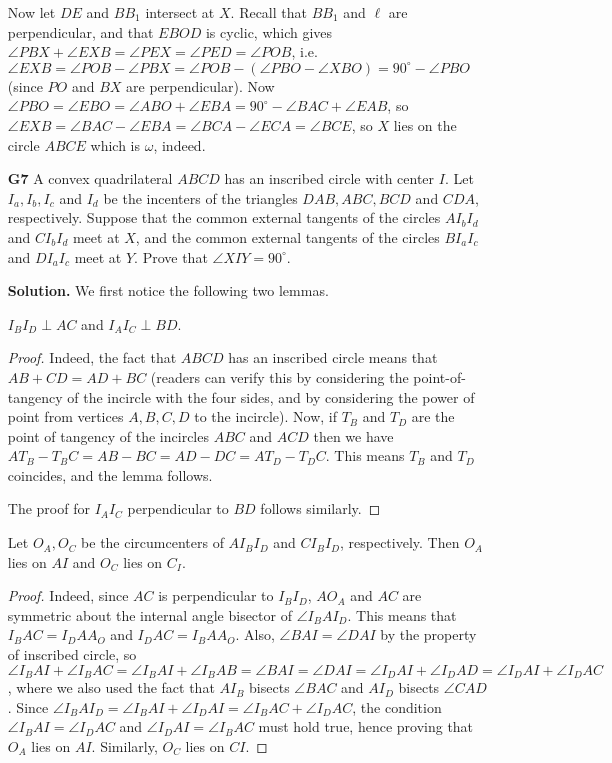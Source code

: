 \documentclass[11pt,a4paper]{article}
\begin{document}
\begin{enumerate}
    Now let $DE$ and $BB_1$ intersect at $X$. Recall that $BB_1$ and $\ell$ are perpendicular, and that $EBOD$ is cyclic, which gives $\angle PBX+\angle EXB=\angle PEX=\angle PED=\angle POB$, i.e. $\angle EXB=\angle POB-\angle PBX=\angle POB-(\angle PBO-\angle XBO)=90^{\circ}-\angle PBO$ (since $PO$ and $BX$ are perpendicular). Now $\angle PBO=\angle EBO=\angle ABO+\angle EBA=90^{\circ}-\angle BAC+\angle EAB$, so $\angle EXB=\angle BAC-\angle EBA=\angle BCA-\angle ECA=\angle BCE$, so $X$ lies on the circle $ABCE$ which is $\omega$, indeed. 
	
	\item[\textbf{G7}] A convex quadrilateral $ABCD$ has an inscribed circle with center $I$. Let $I_a, I_b, I_c$ and $I_d$ be the incenters of the triangles $DAB, ABC, BCD$ and $CDA$, respectively. Suppose that the common external tangents of the circles $AI_bI_d$ and $CI_bI_d$ meet at $X$, and the common external tangents of the circles $BI_aI_c$ and $DI_aI_c$ meet at $Y$. Prove that $\angle{XIY}=90^{\circ}$.
	
	\textbf{Solution.} We first notice the following two lemmas. 
	\begin{lemma}
		$I_BI_D\perp AC$ and $I_AI_C\perp BD$. 
	\end{lemma}
    
    \begin{proof}
    	Indeed, the fact that $ABCD$ has an inscribed circle means that $AB+CD=AD+BC$ (readers can verify this by considering the point-of-tangency of the incircle with the four sides, and by considering the power of point from vertices $A, B, C, D$ to the incircle). Now, if $T_B$ and $T_D$ are the point of tangency of the incircles $ABC$ and $ACD$ then we have $AT_B-T_BC=AB-BC=AD-DC=AT_D-T_DC$. This means $T_B$ and $T_D$ coincides, and the lemma follows.
    	
    	The proof for $I_AI_C$ perpendicular to $BD$ follows similarly. 
    \end{proof}
    
    \begin{lemma}
    	Let $O_A, O_C$ be the circumcenters of $AI_BI_D$ and $CI_BI_D$, respectively. 
    	Then $O_A$ lies on $AI$ and $O_C$ lies on $C_I$. 
    \end{lemma}
    
    \begin{proof}
    	Indeed, since $AC$ is perpendicular to $I_BI_D$, $AO_A$ and $AC$ are symmetric about the internal angle bisector of $\angle I_BAI_D$. This means that $I_BAC=I_DAA_O$ and $I_DAC=I_BAA_O$. Also, $\angle BAI=\angle DAI$ by the property of inscribed circle, so $\angle I_BAI+\angle I_BAC=\angle I_BAI+\angle I_BAB=\angle BAI=\angle DAI=\angle I_DAI+\angle I_DAD=\angle I_DAI+\angle I_DAC$, where we also used the fact that $AI_B$ bisects $\angle BAC$ and $AI_D$ bisects $\angle CAD$. Since $\angle I_BAI_D=\angle I_BAI+\angle I_DAI=\angle I_BAC+\angle I_DAC$, the condition $\angle I_BAI=\angle I_DAC$ and $\angle I_DAI=\angle I_BAC$ must hold true, hence proving that $O_A$ lies on $AI$. Similarly, $O_C$ lies on $CI$. 
    \end{proof}
	

\end{enumerate}
\end{document}
